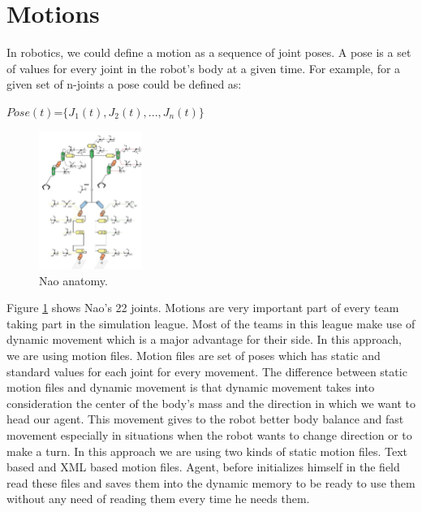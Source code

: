 \section{Motions}
In robotics, we could define a motion as a sequence of joint poses. A pose is a set of values for every joint in the robot's body at a given time.
For example, for a given set of n-joints a pose could be defined as:\\
\begin{center}
$Pose(t)$=$\lbrace J_{1}(t),J_{2}(t),...,J_{n}(t) \rbrace$\\
\end{center}
\begin{figure}[htb!]
\centering
  \includegraphics[width=0.3\textwidth]{Chapter3/figures/Models_NaoAnatomy.png}
  \caption{Nao anatomy.}
  \label{fig:NaoAnatomy}
\end{figure}
Figure \ref{fig:NaoAnatomy} shows Nao's 22 joints.
Motions are very important part of every team taking part in the simulation league. Most of the teams in this league make use of dynamic movement which is a major advantage for their side. In this approach, we are using motion files. Motion files are set of poses which has static and standard values for each joint for every movement. The difference between static motion files and dynamic movement is that dynamic movement takes into consideration the center of the body's mass and the direction in which we want to head our agent. This movement gives to the robot better body balance and fast movement especially in situations when the robot wants to change direction or to make a turn. In this approach we are using two kinds of static motion files. Text based and XML based motion files. Agent, before initializes himself in the field read these files and saves them into the dynamic memory to be ready to use them without any need of reading them every time he needs them.



